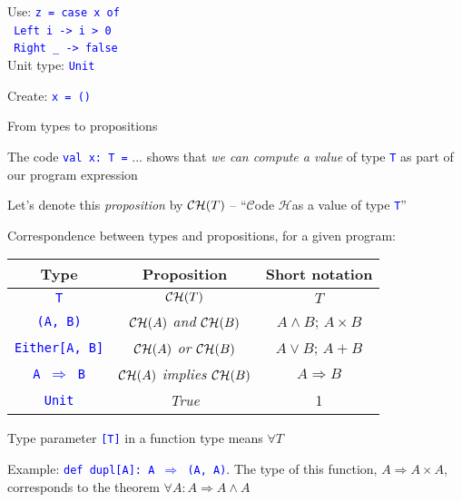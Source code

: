 Use: \texttt{\textcolor{blue}{\footnotesize{}z = case x of}}~\\
\texttt{\textcolor{blue}{\footnotesize{} Left i -> i > 0}}~\\
\texttt{\textcolor{blue}{\footnotesize{} Right \_ -> false}}~\\

Unit type: \texttt{\textcolor{blue}{\footnotesize{}Unit}}{\footnotesize\par}

Create: \texttt{\textcolor{blue}{\footnotesize{}x = ()}}{\footnotesize\par}

From types to propositions

The code \texttt{\textcolor{blue}{\footnotesize{}val x:\ T =}} ...
shows that \emph{we can compute a value} of type \texttt{\textcolor{blue}{\footnotesize{}T}}
as part of our program expression

Let's denote this \emph{proposition} by ${\cal CH}(T)$ – ``$\mathcal{C}$ode
$\mathcal{H}$as a value of type \texttt{\textcolor{blue}{\footnotesize{}T}}''

Correspondence between types and propositions, for a given program:
\begin{center}
\begin{tabular}{|c|c|c|}
\hline 
\textbf{Type} & \textbf{Proposition} & \textbf{Short notation}\tabularnewline
\hline 
\hline 
\texttt{\textcolor{blue}{\footnotesize{}T}} & ${\cal CH}(T)$ & $T$\tabularnewline
\hline 
\texttt{\textcolor{blue}{\footnotesize{}(A, B)}} & ${\cal CH}(A)$ \emph{and} ${\cal CH}(B)$ & $A\wedge B$; $A\times B$\tabularnewline
\hline 
\texttt{\textcolor{blue}{\footnotesize{}Either{[}A, B{]}}} & ${\cal CH}(A)$ \emph{or} ${\cal CH}(B)$ & $A\vee B$; $A+B$\tabularnewline
\hline 
\texttt{\textcolor{blue}{\footnotesize{}A $\Rightarrow$ B}} & ${\cal CH}(A)$ \emph{implies} ${\cal CH}(B)$ & $A\Rightarrow B$\tabularnewline
\hline 
\texttt{\textcolor{blue}{\footnotesize{}Unit}} & \emph{True} & 1\tabularnewline
\hline 
\end{tabular}
\par\end{center}

Type parameter \texttt{\textcolor{blue}{\footnotesize{}{[}T{]}}} in
a function type means $\forall T$

Example: \texttt{\textcolor{blue}{\footnotesize{}def dupl{[}A{]}:\ A
$\Rightarrow$ (A, A)}}. The type of this function, $A\Rightarrow A\times A$,
corresponds to the theorem $\forall A:A\Rightarrow A\wedge A$

